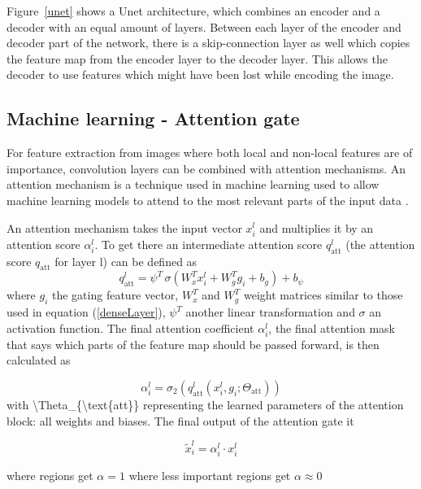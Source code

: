 \documentclass{article}
\begin{document}
Figure~\ref{unet} shows a Unet architecture, which combines an encoder and a decoder with an equal amount of layers. Between each layer of the encoder and decoder part of the network, there is a skip-connection layer as well which copies the feature map from the encoder layer to the decoder layer. This allows the decoder to use features which might have been lost while encoding the image.

\subsection{Machine learning - Attention gate}

For feature extraction from images where both local and non-local features are of importance, convolution layers can be combined with attention mechanisms. An attention mechanism is a technique used in machine learning used to allow machine learning models to attend to the most relevant parts of the input data \citep{vaswani2017attention}.

An attention mechanism takes the input vector $x_{i}^{l}$ and multiplies it by an attention score $\alpha_{i}^{l}$. To get there an intermediate attention score $q_{\text{att}}^{l}$ (the attention score $q_{\text{att}}$ for layer l) can be defined as
\begin{equation}
q_{\text{att}}^{l} = \psi^{T} \, \sigma \left( W_{x}^{T} x_{i}^{l} + W_{g}^{T} g_{i} + b_{g} \right) + b_{\psi}
\end{equation}
where $g_{i}$ the gating feature vector, $W_{x}^{T}$ and $W_{g}^{T}$ weight matrices similar to those used in equation (\ref{denseLayer}), $\psi^{T}$ another linear transformation and $\sigma$ an activation function. The final attention coefficient $\alpha_{i}^{l}$, the final attention mask that says which parts of the feature map should be passed forward, is then calculated as

\begin{equation}
\alpha_{i}^{l} = \sigma_{2} \left( q_{\text{att}}^{l}(x_{i}^{l}, g_{i}; \Theta_{\text{att}}) \right)
\end{equation}
with {\textbackslash}Theta\_\{{\textbackslash}text\{att\}\} representing the learned parameters of the attention block: all weights and biases. The final output of the attention gate it

\begin{equation}
\tilde{x}_i^l = \alpha_i^l \cdot x_i^l
\end{equation}

where regions get $\alpha = 1$ where less important regions get $\alpha \approx 0$
\end{document}

